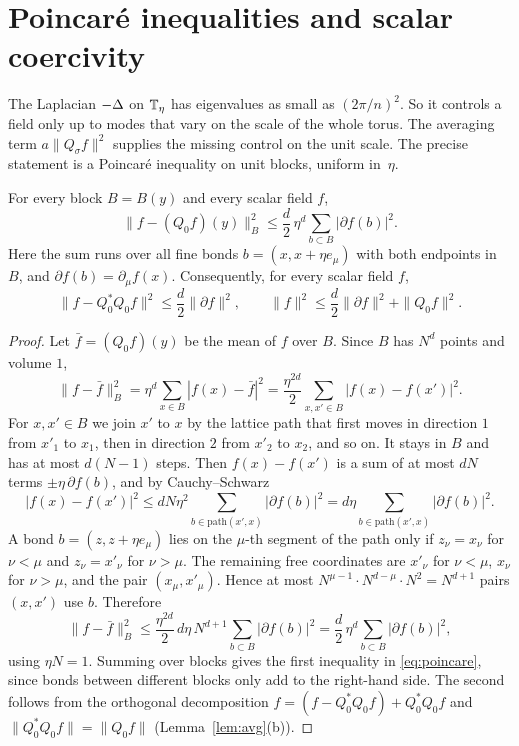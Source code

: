 \section{Poincar\'e inequalities and scalar coercivity}\label{sec:poincare}

The Laplacian $-\Delta$ on $\mathbb T_\eta$ has eigenvalues as small as $(2\pi/n)^2$. So it controls a field only up to modes that vary on the scale of the whole torus. The averaging term $a\|Q_\sigma f\|^2$ supplies the missing control on the unit scale. The precise statement is a Poincar\'e inequality on unit blocks, uniform in~$\eta$.

\begin{lemma}\label{lem:block-poincare}
For every block $B=B(y)$ and every scalar field $f$,
\[
\|f-(Q_0f)(y)\|_B^2\le\frac d2\,\eta^d\sum_{b\subset B}|\partial f(b)|^2 .
\]
Here the sum runs over all fine bonds $b=(x,x+\eta e_\mu)$ with both endpoints in $B$, and $\partial f(b)=\partial_\mu f(x)$. Consequently, for every scalar field $f$,
\begin{equation}\label{eq:poincare}
\|f-Q_0^*Q_0f\|^2\le\frac d2\|\partial f\|^2,\qquad \|f\|^2\le\frac d2\|\partial f\|^2+\|Q_0f\|^2 .
\end{equation}
\end{lemma}

\begin{proof}
Let $\bar f=(Q_0f)(y)$ be the mean of $f$ over $B$. Since $B$ has $N^d$ points and volume $1$,
\[
\|f-\bar f\|_B^2=\eta^d\sum_{x\in B}|f(x)-\bar f|^2=\frac{\eta^{2d}}2\sum_{x,x'\in B}|f(x)-f(x')|^2 .
\]
For $x,x'\in B$ we join $x'$ to $x$ by the lattice path that first moves in direction $1$ from $x'_1$ to $x_1$, then in direction $2$ from $x'_2$ to $x_2$, and so on. It stays in $B$ and has at most $d(N-1)$ steps. Then $f(x)-f(x')$ is a sum of at most $dN$ terms $\pm\eta\,\partial f(b)$, and by Cauchy--Schwarz
\[
|f(x)-f(x')|^2\le dN\eta^2\sum_{b\in\text{path}(x',x)}|\partial f(b)|^2=d\eta\sum_{b\in\text{path}(x',x)}|\partial f(b)|^2 .
\]
A bond $b=(z,z+\eta e_\mu)$ lies on the $\mu$-th segment of the path only if $z_\nu=x_\nu$ for $\nu<\mu$ and $z_\nu=x'_\nu$ for $\nu>\mu$. The remaining free coordinates are $x'_\nu$ for $\nu<\mu$, $x_\nu$ for $\nu>\mu$, and the pair $(x_\mu,x'_\mu)$. Hence at most $N^{\mu-1}\cdot N^{d-\mu}\cdot N^2=N^{d+1}$ pairs $(x,x')$ use $b$. Therefore
\[
\|f-\bar f\|_B^2\le\frac{\eta^{2d}}2\,d\eta\,N^{d+1}\sum_{b\subset B}|\partial f(b)|^2=\frac d2\,\eta^d\sum_{b\subset B}|\partial f(b)|^2,
\]
using $\eta N=1$. Summing over blocks gives the first inequality in \eqref{eq:poincare}, since bonds between different blocks only add to the right-hand side. The second follows from the orthogonal decomposition $f=(f-Q_0^*Q_0f)+Q_0^*Q_0f$ and $\|Q_0^*Q_0f\|=\|Q_0f\|$ (Lemma~\ref{lem:avg}(b)).
\end{proof}

